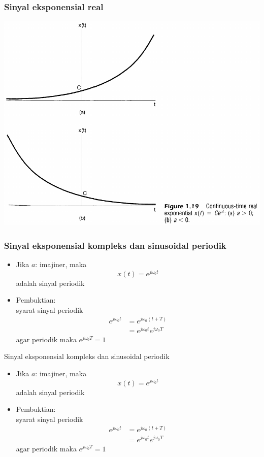 \documentclass[pdflatex,compress,mathserif]{beamer}
\begin{document}
\begin{frame}
	\frametitle{Sinyal eksponensial real}
	\begin{center}
		\includegraphics[width=0.7\linewidth]{img/img33}
	\end{center}
\end{frame}

\begin{frame}
	\frametitle{Sinyal eksponensial kompleks dan sinusoidal periodik}
	\begin{itemize}
		\item Jika $ a $: imajiner, maka
		$$ x(t) = e^{j\omega_0 t} $$ adalah sinyal periodik
		\item Pembuktian:\\
		syarat sinyal periodik
		\begin{align*}
			e^{j\omega_0 t} &= e^{j\omega_0 (t+T)} \\
			&= e^{j\omega_0 t} e^{j\omega_0 T}
		\end{align*}
		agar periodik maka $ e^{j\omega_0 T} = 1 $
	\end{itemize}
\end{frame}

\begin{frame}{Sinyal eksponensial kompleks dan sinusoidal periodik}
	\begin{itemize}
		\item Jika $ a $: imajiner, maka
		$$ x(t) = e^{j\omega_0 t} $$ adalah sinyal periodik
		\item Pembuktian:\\
		syarat sinyal periodik
		\begin{align*}
		e^{j\omega_0 t} &= e^{j\omega_0 (t+T)} \\
		&= e^{j\omega_0 t} e^{j\omega_0 T}
		\end{align*}
		agar periodik maka $ e^{j\omega_0 T} = 1 $
	\end{itemize}
\end{frame}
\end{document}
